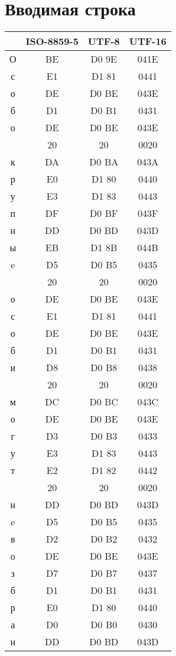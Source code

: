 \section{Вводимая строка}
\begin{center}
\begin{tabular}{|c|c|c|c|}
\hline
 & ISO-8859-5 & UTF-8 & UTF-16\\
\hline
О & BE & D0 9E & 041E\\
с & E1 & D1 81 & 0441\\
о & DE & D0 BE & 043E\\
б & D1 & D0 B1 & 0431\\
о & DE & D0 BE & 043E\\
  & 20 & 20 & 0020\\
к & DA & D0 BA & 043A\\
р & E0 & D1 80 & 0440\\
у & E3 & D1 83 & 0443\\
п & DF & D0 BF & 043F\\
н & DD & D0 BD & 043D\\
ы & EB & D1 8B & 044B\\
e & D5 & D0 B5 & 0435\\
  & 20 & 20 & 0020\\
о & DE & D0 BE & 043E\\
с & E1 & D1 81 & 0441\\
о & DE & D0 BE & 043E\\
б & D1 & D0 B1 & 0431\\
и & D8 & D0 B8 & 0438\\
  & 20 & 20 & 0020\\
м & DC & D0 BC & 043C\\
о & DE & D0 BE & 043E\\
г & D3 & D0 B3 & 0433\\
у & E3 & D1 83 & 0443\\
т & E2 & D1 82 & 0442\\
  & 20 & 20 & 0020\\
н & DD & D0 BD & 043D\\
e & D5 & D0 B5 & 0435\\
в & D2 & D0 B2 & 0432\\
о & DE & D0 BE & 043E\\
з & D7 & D0 B7 & 0437\\
б & D1 & D0 B1 & 0431\\
р & E0 & D1 80 & 0440\\
а & D0 & D0 B0 & 0430\\
н & DD & D0 BD & 043D\\

\end{tabular}
\end{center}
